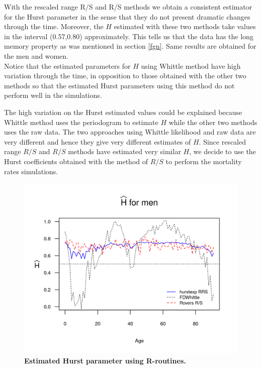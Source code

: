\documentclass[smallextended]{svjour3}
\begin{document}
With the rescaled range R/S and R/S  methods we obtain a consistent estimator
for the Hurst
parameter in the sense that they do not present dramatic changes through the
time. Moreover,
the $H$ estimated with these two methods take values in the interval
(0.57,0.80) approximately. This tells us that the data has the long memory
property as
was mentioned in section \ref{fgn}. Same results are obtained for the men and
women.\\


Notice that the estimated parameters for $H$ using Whittle method have high
variation through the time, in opposition to those
obtained with the other two methods so that the estimated
Hurst parameters using this method do not perform well in the simulations.

The high variation on the Hurst estimated values could be explained because
Whittle method uses
the periodogram to estimate $H$ while the other two methods uses the raw data.
The two approaches using Whittle likelihood and raw data are very different and
hence they give very different estimates of $H$. Since rescaled range $R/S$ and
$R/S$  methods have estimated very similar $H$, we decide to use the Hurst
coefficients obtained with the
method of $R/S$ to perform the mortality rates simulations. \\

\begin{figure}[H]
    \includegraphics{Hurst-Men.png}
    \caption{\bf Estimated Hurst parameter using R-routines.}
    \label{graph-Hurst_Est_Me}
\end{figure}\vspace*{0.1cm}
\end{document}
